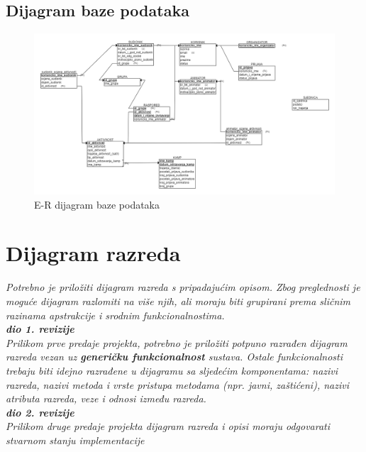 			\eject
			
			
			\subsection{Dijagram baze podataka}
				\begin{figure}[H]
				\centerline{\includegraphics[width=\linewidth]{slike/ER_model_baze.png}}
				\caption{E-R dijagram baze podataka}
				\label{fig:ERdijagram}
			\end{figure}
			
			\eject
			
			
		\section{Dijagram razreda}
		
			\textit{Potrebno je priložiti dijagram razreda s pripadajućim opisom. Zbog preglednosti je moguće dijagram razlomiti na više njih, ali moraju biti grupirani prema sličnim razinama apstrakcije i srodnim funkcionalnostima.}\\
			
			\textbf{\textit{dio 1. revizije}}\\
			
			\textit{Prilikom prve predaje projekta, potrebno je priložiti potpuno razrađen dijagram razreda vezan uz \textbf{generičku funkcionalnost} sustava. Ostale funkcionalnosti trebaju biti idejno razrađene u dijagramu sa sljedećim komponentama: nazivi razreda, nazivi metoda i vrste pristupa metodama (npr. javni, zaštićeni), nazivi atributa razreda, veze i odnosi između razreda.}\\
			
			\textbf{\textit{dio 2. revizije}}\\			
			
			\textit{Prilikom druge predaje projekta dijagram razreda i opisi moraju odgovarati stvarnom stanju implementacije}
			
